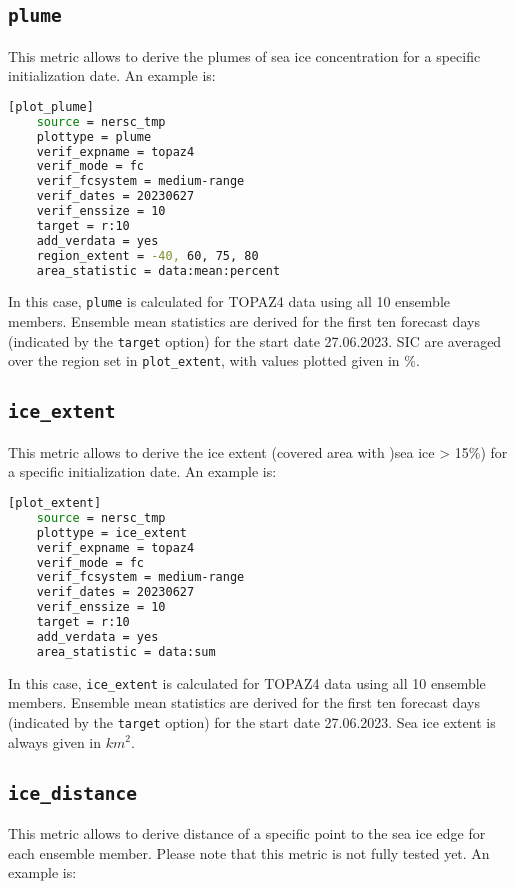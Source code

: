 \documentclass[DIV=10, parskip=full]{scrreprt}
\newcommand{\notimplement}[1]{#1}
\begin{document}
\subsection{\texttt{plume}}
This metric allows to derive the plumes of sea ice concentration for a specific initialization date. An example is:

\begin{lstlisting}[language=bash]
	[plot_plume]
	source = nersc_tmp   
	plottype = plume 
	verif_expname = topaz4 
	verif_mode = fc
	verif_fcsystem = medium-range
	verif_dates = 20230627
	verif_enssize = 10
	target = r:10
	add_verdata = yes
	region_extent = -40, 60, 75, 80
	area_statistic = data:mean:percent
\end{lstlisting}

In this case, \texttt{plume} is calculated for TOPAZ4 data using all 10 ensemble members. Ensemble mean statistics are derived for the first ten forecast days (indicated by the \texttt{target} option) for the start date 27.06.2023. SIC are averaged over the region set in \texttt{plot\_extent}, with values plotted given in \%.

\subsection{\texttt{ice\_extent}}
This metric allows to derive the ice extent (covered area with )sea ice > 15\%) for a specific initialization date. An example is:

\begin{lstlisting}[language=bash]
	[plot_extent]
	source = nersc_tmp   
	plottype = ice_extent 
	verif_expname = topaz4 
	verif_mode = fc
	verif_fcsystem = medium-range
	verif_dates = 20230627
	verif_enssize = 10
	target = r:10
	add_verdata = yes
	area_statistic = data:sum
\end{lstlisting}

In this case, \texttt{ice\_extent} is calculated for TOPAZ4 data using all 10 ensemble members. Ensemble mean statistics are derived for the first ten forecast days (indicated by the \texttt{target} option) for the start date 27.06.2023. Sea ice extent is always given in $km^2$.

\subsection{\texttt{ice\_distance}}
This metric allows to derive distance of a specific point to the sea ice edge for each ensemble member. \notimplement{Please note that this metric is not fully tested yet. An example is}:
\end{document}

